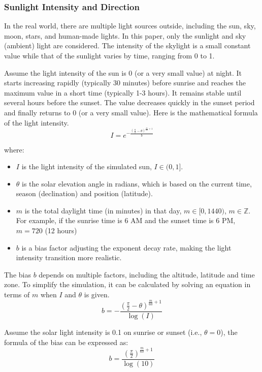 \documentclass{article}
\begin{document}
\subsubsection {Sunlight Intensity and Direction}
In the real world, there are multiple light sources outside, including the sun, sky, moon, stars, 
and human-made lights. In this paper, only the sunlight and sky (ambient) light are considered. 
The intensity of the skylight is a small constant value while that of the sunlight varies by 
time, ranging from 0 to 1.

Assume the light intensity of the sun is 0 (or a very small value) at night. It starts increasing 
rapidly (typically 30 minutes) before sunrise and reaches the maximum value in a short time 
(typically 1-3 hours). It remains stable until several hours before the sunset. The value 
decreases quickly in the sunset period and finally returns to 0 (or a very small value). Here is 
the mathematical formula of the light intensity.
\[
  I = e^{-\frac{\left(\frac{\pi}{2} - \theta\right)^{\frac{m}{60} + 1}}{b}}
\]

where:
\begin{itemize}
  \item \( I \) is the light intensity of the simulated sun, \( I \in (0, 1] \).
  \item \( \theta \) is the solar elevation angle in radians, which is based on the current time, 
  season (declination) and position (latitude).
  \item \( m \) is the total daylight time (in minutes) in that day, \( m \in [0, 1440) \), \( m \in \mathbb{Z} \). 
  For example, if the sunrise time is 6 AM and the sunset time is 6 PM, \( m=720 \) (12 hours)
  \item \( b \) is a bias factor adjusting the exponent decay rate, making the light intensity
  transition more realistic.
\end{itemize}

The bias \( b \) depends on multiple factors, including the altitude, latitude and time zone. To
simplify the simulation, it can be calculated by solving an equation in terms of \( m \) when 
\( I \) and \( \theta\) is given.
\[
  b = -\frac{\left(\frac{\pi}{2} - \theta\right)^{\frac{m}{60} + 1}}{\log(I)}
\]

Assume the solar light intensity is 0.1 on sunrise or sunset (i.e., \( \theta=0\)), the formula 
of the bias can be expressed as:
\[
  b = \frac{\left(\frac{\pi}{2}\right)^{\frac{m}{60} + 1}}{\log(10)}
\]
\end{document}
